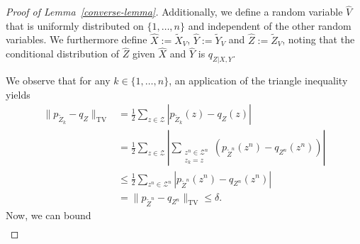 \documentclass[journal]{IEEEtran}
\newcommand{\lemmaconst}{\delta}
\newcommand{\channelpmf}{q}
\newcommand{\codebookpmf}{p}
\newcommand{\channelInOne}{X}
\newcommand{\channelInTwo}{Y}
\newcommand{\channelOut}{Z}
\newcommand{\channelOutAlph}{\mathcal{Z}}
\newcommand{\channelOutAlphElement}{z}
\newcommand{\codebookBlocklength}{n}
\newcommand{\blockIndex}{k}
\newcommand{\totalvariation}[1]{\lVert #1 \rVert_\mathrm{TV}}
\newcommand{\absolute}[1]{\left\lvert #1 \right\rvert}
\newcommand{\timeSharingRV}{V}
\begin{document}
\begin{proof}[Proof of Lemma~\ref{converse-lemma}]
Additionally, we define a random variable $\hat{\timeSharingRV}$ that is uniformly distributed on $\{1,\dots,\codebookBlocklength\}$ and independent of the other random variables. We furthermore define $\hat{\channelInOne} := \tilde{\channelInOne}_\timeSharingRV$, $\hat{\channelInTwo} := \tilde{\channelInTwo}_\timeSharingRV$ and $\hat{\channelOut} := \tilde{\channelOut}_\timeSharingRV$, noting that the conditional distribution of $\hat{\channelOut}$ given $\hat{\channelInOne}$ and $\hat{\channelInTwo}$ is $\channelpmf_{\channelOut | \channelInOne, \channelInTwo}$.

We observe that for any $\blockIndex \in \{1, \dots, \codebookBlocklength\}$, an application of the triangle inequality yields
\begin{align}
\totalvariation{\codebookpmf_{\tilde{\channelOut}_\blockIndex} - \channelpmf_{\channelOut}}
&=
\frac{1}{2}
\sum_{\channelOutAlphElement \in \channelOutAlph}
  \absolute{
    \codebookpmf_{\tilde{\channelOut}_\blockIndex}(\channelOutAlphElement)
    -
    \channelpmf_{\channelOut}(\channelOutAlphElement)
  }
\nonumber
\\
&=
\frac{1}{2}
\sum_{\channelOutAlphElement \in \channelOutAlph}
  \absolute{
    \sum_{\substack{\channelOutAlphElement^\codebookBlocklength \in \channelOutAlph^\codebookBlocklength \\
                    \channelOutAlphElement_\blockIndex = \channelOutAlphElement}}
    (
      \codebookpmf_{\tilde{\channelOut}^\codebookBlocklength}(\channelOutAlphElement^\codebookBlocklength)
      -
      \channelpmf_{\channelOut^\codebookBlocklength}(\channelOutAlphElement^\codebookBlocklength)
    )
  }
\nonumber
\\
&\leq
\frac{1}{2}
\sum_{\channelOutAlphElement^\codebookBlocklength \in \channelOutAlph^\codebookBlocklength}
  \absolute{
      \codebookpmf_{\tilde{\channelOut}^\codebookBlocklength}(\channelOutAlphElement^\codebookBlocklength)
      -
      \channelpmf_{\channelOut^\codebookBlocklength}(\channelOutAlphElement^\codebookBlocklength)
  }
\nonumber
\\
&=
\totalvariation{\codebookpmf_{\tilde{\channelOut}^\codebookBlocklength} - \channelpmf_{\channelOut^\codebookBlocklength}}
\leq
\lemmaconst.
\label{converse-lemma-totvar-single}
\end{align}
Now, we can bound
\begin{align}
\label{converse-lemma-tvbound-def}

\end{align}
\end{proof}
\end{document}
